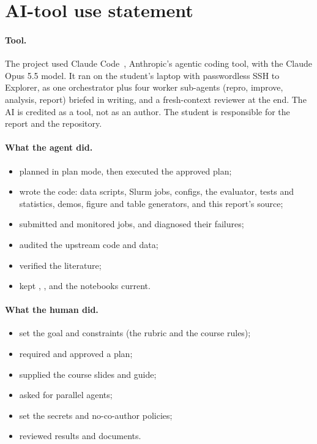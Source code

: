 \section{AI-tool use statement}\label{sec:aiuse}

\paragraph{Tool.} The project used Claude Code~\citep{claudecode}, Anthropic's agentic coding tool, with the Claude Opus 5.5 model. It ran on the student's laptop with passwordless SSH to Explorer, as one orchestrator plus four worker sub-agents (repro, improve, analysis, report) briefed in writing, and a fresh-context reviewer at the end.
The AI is credited as a tool, not as an author. The student is responsible for the report and the repository.

\paragraph{What the agent did.}
\begin{itemize}[leftmargin=*]
  \item planned in plan mode, then executed the approved plan;
  \item wrote the code: data scripts, Slurm jobs, configs, the evaluator, tests and statistics, demos, figure and table generators, and this report's source;
  \item submitted and monitored jobs, and diagnosed their failures;
  \item audited the upstream code and data;
  \item verified the literature;
  \item kept , ,  and the notebooks current.
\end{itemize}

\paragraph{What the human did.}
\begin{itemize}[leftmargin=*]
  \item set the goal and constraints (the rubric and the course rules);
  \item required and approved a plan;
  \item supplied the course slides and guide;
  \item asked for parallel agents;
  \item set the secrets and no-co-author policies;
  \item reviewed results and documents.
\end{itemize}

